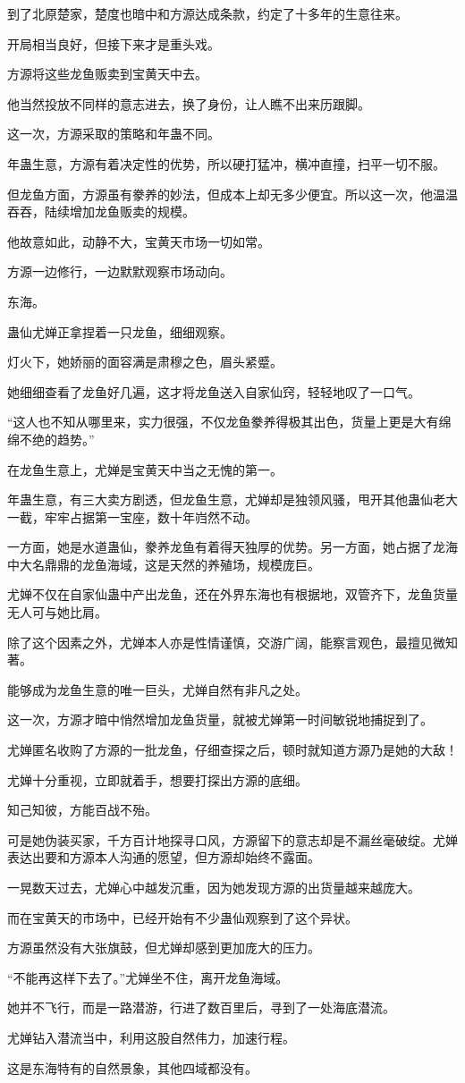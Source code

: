 \begin{this_body}
到了北原楚家，楚度也暗中和方源达成条款，约定了十多年的生意往来。

开局相当良好，但接下来才是重头戏。

方源将这些龙鱼贩卖到宝黄天中去。

他当然投放不同样的意志进去，换了身份，让人瞧不出来历跟脚。

这一次，方源采取的策略和年蛊不同。

年蛊生意，方源有着决定性的优势，所以硬打猛冲，横冲直撞，扫平一切不服。

但龙鱼方面，方源虽有豢养的妙法，但成本上却无多少便宜。所以这一次，他温温吞吞，陆续增加龙鱼贩卖的规模。

他故意如此，动静不大，宝黄天市场一切如常。

方源一边修行，一边默默观察市场动向。

东海。

蛊仙尤婵正拿捏着一只龙鱼，细细观察。

灯火下，她娇丽的面容满是肃穆之色，眉头紧蹙。

她细细查看了龙鱼好几遍，这才将龙鱼送入自家仙窍，轻轻地叹了一口气。

“这人也不知从哪里来，实力很强，不仅龙鱼豢养得极其出色，货量上更是大有绵绵不绝的趋势。”

在龙鱼生意上，尤婵是宝黄天中当之无愧的第一。

年蛊生意，有三大卖方剧透，但龙鱼生意，尤婵却是独领风骚，甩开其他蛊仙老大一截，牢牢占据第一宝座，数十年岿然不动。

一方面，她是水道蛊仙，豢养龙鱼有着得天独厚的优势。另一方面，她占据了龙海中大名鼎鼎的龙鱼海域，这是天然的养殖场，规模庞巨。

尤婵不仅在自家仙蛊中产出龙鱼，还在外界东海也有根据地，双管齐下，龙鱼货量无人可与她比肩。

除了这个因素之外，尤婵本人亦是性情谨慎，交游广阔，能察言观色，最擅见微知著。

能够成为龙鱼生意的唯一巨头，尤婵自然有非凡之处。

这一次，方源才暗中悄然增加龙鱼货量，就被尤婵第一时间敏锐地捕捉到了。

尤婵匿名收购了方源的一批龙鱼，仔细查探之后，顿时就知道方源乃是她的大敌！

尤婵十分重视，立即就着手，想要打探出方源的底细。

知己知彼，方能百战不殆。

可是她伪装买家，千方百计地探寻口风，方源留下的意志却是不漏丝毫破绽。尤婵表达出要和方源本人沟通的愿望，但方源却始终不露面。

一晃数天过去，尤婵心中越发沉重，因为她发现方源的出货量越来越庞大。

而在宝黄天的市场中，已经开始有不少蛊仙观察到了这个异状。

方源虽然没有大张旗鼓，但尤婵却感到更加庞大的压力。

“不能再这样下去了。”尤婵坐不住，离开龙鱼海域。

她并不飞行，而是一路潜游，行进了数百里后，寻到了一处海底潜流。

尤婵钻入潜流当中，利用这股自然伟力，加速行程。

这是东海特有的自然景象，其他四域都没有。

\end{this_body}

